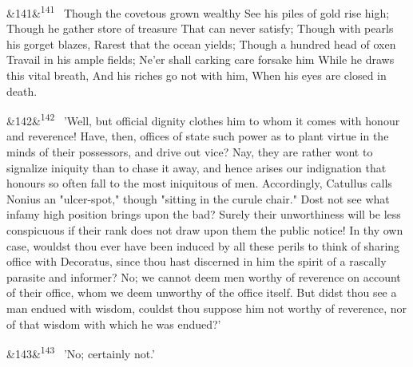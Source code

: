 \documentclass[12pt]{article}
\newcommand{\para}[1][]{\par\noindent\ifx&#1&\else\textsuperscript{\footnotesize #1}~\fi}
\begin{document}
\para[141] Though the covetous grown wealthy See his piles of gold rise high; Though he gather store of treasure That can never satisfy; Though with pearls his gorget blazes, Rarest that the ocean yields; Though a hundred head of oxen Travail in his ample fields; Ne'er shall carking care forsake him While he draws this vital breath, And his riches go not with him, When his eyes are closed in death.

\para[142] 'Well, but official dignity clothes him to whom it comes with honour and reverence! Have, then, offices of state such power as to plant virtue in the minds of their possessors, and drive out vice? Nay, they are rather wont to signalize iniquity than to chase it away, and hence arises our indignation that honours so often fall to the most iniquitous of men. Accordingly, Catullus calls Nonius an "ulcer-spot," though "sitting in the curule chair." Dost not see what infamy high position brings upon the bad? Surely their unworthiness will be less conspicuous if their rank does not draw upon them the public notice! In thy own case, wouldst thou ever have been induced by all these perils to think of sharing office with Decoratus, since thou hast discerned in him the spirit of a rascally parasite and informer? No; we cannot deem men worthy of reverence on account of their office, whom we deem unworthy of the office itself. But didst thou see a man endued with wisdom, couldst thou suppose him not worthy of reverence, nor of that wisdom with which he was endued?'

\para[143] 'No; certainly not.'
\end{document}
